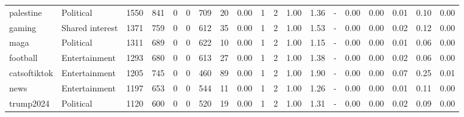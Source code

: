 \begin{tabular}{llrrrrrrrrrrrrrrrrr}
       palestine &       Political &   1550 &    841 &                           0 &                            0 &           709 &                         20 &     0.00 &    1 &      2 & 1.00 &   1.36 &                                - &   0.00 &         0.00 &                                0.01 &                                   0.10 &                                     0.00 \\
          gaming & Shared interest &   1371 &    759 &                           0 &                            0 &           612 &                         35 &     0.00 &    1 &      2 & 1.00 &   1.53 &                                - &   0.00 &         0.00 &                                0.02 &                                   0.12 &                                     0.00 \\
            maga &       Political &   1311 &    689 &                           0 &                            0 &           622 &                         10 &     0.00 &    1 &      2 & 1.00 &   1.15 &                                - &   0.00 &         0.00 &                                0.01 &                                   0.06 &                                     0.00 \\
        football &   Entertainment &   1293 &    680 &                           0 &                            0 &           613 &                         27 &     0.00 &    1 &      2 & 1.00 &   1.38 &                                - &   0.00 &         0.00 &                                0.02 &                                   0.06 &                                     0.00 \\
    catsoftiktok &   Entertainment &   1205 &    745 &                           0 &                            0 &           460 &                         89 &     0.00 &    1 &      2 & 1.00 &   1.90 &                                - &   0.00 &         0.00 &                                0.07 &                                   0.25 &                                     0.01 \\
            news &   Entertainment &   1197 &    653 &                           0 &                            0 &           544 &                         11 &     0.00 &    1 &      2 & 1.00 &   1.26 &                                - &   0.00 &         0.00 &                                0.01 &                                   0.11 &                                     0.00 \\
       trump2024 &       Political &   1120 &    600 &                           0 &                            0 &           520 &                         19 &     0.00 &    1 &      2 & 1.00 &   1.31 &                                - &   0.00 &         0.00 &                                0.02 &                                   0.09 &                                     0.00 \\

\end{tabular}
